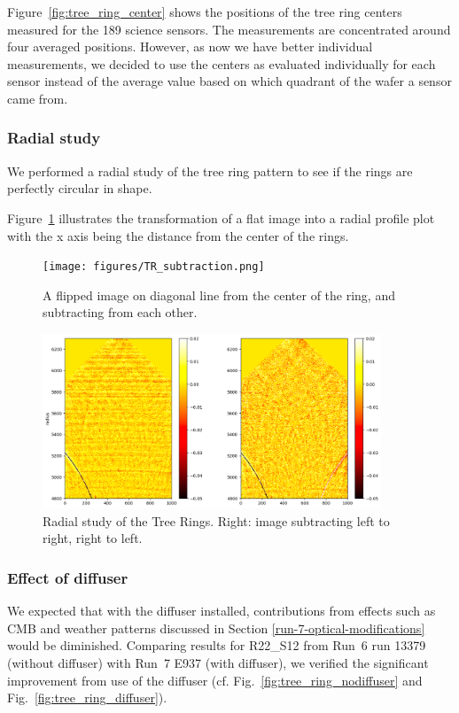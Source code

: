 Figure~\ref{fig:tree_ring_center} shows the positions of the tree ring centers measured for the 189 science sensors. The measurements are concentrated around four averaged positions. However, as now we have better individual measurements, we decided to use the centers as evaluated individually for each sensor instead of the average value based on which quadrant of the wafer a sensor came from.


\subsubsection{Radial study}
We performed a radial study of the tree ring pattern to see if the rings are perfectly circular in shape.

Figure~\ref{fig:tree-ring-radial-transform} illustrates the transformation of a flat image into a radial profile plot with the x axis being the distance from the center of the rings.

\begin{figure}[ht]
\centering
\texttt{[image: figures/TR\_subtraction.png]}
\caption{A flipped image on diagonal line from the center of the ring, and subtracting from each other.}
\label{fig:tree-ring-radial-transform}
\end{figure}

\begin{figure}[ht]
\centering
\includegraphics[width=0.9\textwidth]{figures/TR_radial.png}
\caption{Radial study of the Tree Rings. Right: image subtracting left to right, right to left.}
\end{figure}

\subsubsection{Effect of diffuser}
We expected that with the diffuser installed, contributions from effects such as CMB and weather patterns discussed in Section \ref{run-7-optical-modifications} would be diminished. Comparing results for R22\_S12 from Run~6 run 13379 (without diffuser) with Run~7 E937 (with diffuser), we verified the significant improvement from use of the diffuser (cf. Fig.~\ref{fig:tree_ring_nodiffuser} and Fig.~\ref{fig:tree_ring_diffuser}).

